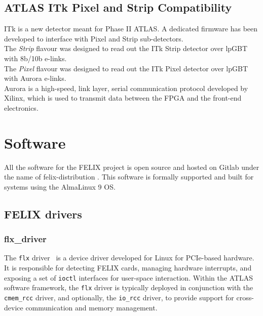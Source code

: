 \subsection{\acs{ATLAS} \acs{ITk} Pixel and Strip Compatibility}
\label{subsec:felix-itk}

\acf{ITk} \cite{atlas-itk-pixel-detector} is a new detector meant for Phase II \acs{ATLAS}.
A dedicated firmware has been developed to interface with  Pixel and Strip sub-detectors.\\

The \emph{Strip} flavour was designed to read out the \acs{ITk} Strip detector over \acs{lpGBT} with 8b/10b e-links.\\
The \emph{Pixel} flavour was designed to read out the \acs{ITk} Pixel detector over \acs{lpGBT} with Aurora \cite{aurora-protocol} e-links.\\

Aurora \cite{aurora-protocol} is a high-speed, link layer, serial communication protocol developed by Xilinx, which is used to transmit data between the \acs{FPGA} and the front-end electronics.

\section{Software}

All the software for the \acs{FELIX} project is open source and hosted on Gitlab under the name of felix-distribution \cite{felix-distribution}. This software is formally supported and built for systems using the AlmaLinux 9 \acl{OS}.

\subsection{\acs{FELIX} drivers}

\subsubsection{flx\_driver}

The \texttt{flx} driver~\cite{felix-driver} is a device driver developed for Linux for \acs{PCIe}-based hardware. It is responsible for detecting \acs{FELIX} cards, managing hardware interrupts, and exposing a set of \texttt{ioctl} interfaces for user-space interaction. Within the \acs{ATLAS} software framework, the \texttt{flx} driver is typically deployed in conjunction with the \texttt{cmem\_rcc} driver, and optionally, the \texttt{io\_rcc} driver, to provide support for cross-device communication and memory management.

